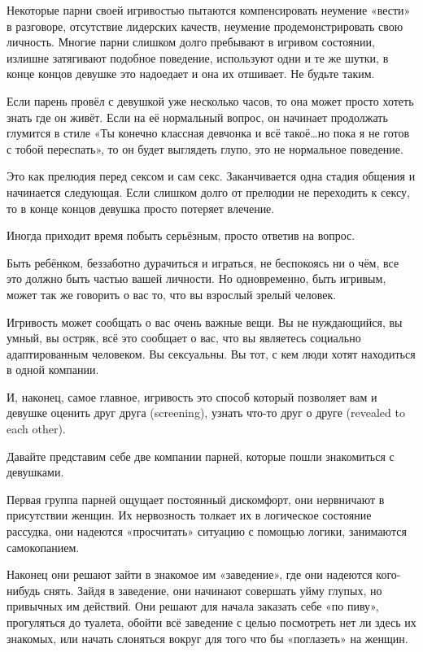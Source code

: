 Некоторые парни своей игривостью пытаются компенсировать неумение «вести» в разговоре, отсутствие лидерских качеств, неумение продемонстрировать свою личность. Многие парни слишком долго пребывают в игривом состоянии, излишне затягивают подобное поведение, используют одни и те же шутки, в конце концов девушке это надоедает и она их отшивает. Не будьте таким.

Если парень провёл с девушкой уже несколько часов, то она может просто хотеть знать где он живёт. Если на её нормальный вопрос, он начинает продолжать глумится в стиле «Ты конечно классная девчонка и всё такоё\ldots но пока я не готов с тобой переспать», то он будет выглядеть глупо, это не нормальное поведение.

Это как прелюдия перед сексом и сам секс. Заканчивается одна стадия общения и начинается следующая. Если слишком долго от прелюдии не переходить к сексу, то в конце концов девушка просто потеряет влечение.

Иногда приходит время побыть серьёзным, просто ответив на вопрос.

Быть ребёнком, беззаботно дурачиться и играться, не беспокоясь ни о чём, все это должно быть частью вашей личности. Но одновременно, быть игривым, может так же говорить о вас то, что вы взрослый зрелый человек.

Игривость может сообщать о вас очень важные вещи. Вы не нуждающийся, вы умный, вы остряк, всё это сообщает о вас, что вы являетесь социально адаптированным человеком. Вы сексуальны. Вы тот, с кем люди хотят находиться в одной компании.

И, наконец, самое главное, игривость это способ который позволяет вам и девушке оценить друг друга (screening), узнать что-то друг о друге (revealed to each other).

Давайте представим себе две компании парней, которые пошли знакомиться с девушками.

Первая группа парней ощущает постоянный дискомфорт, они нервничают в присутствии женщин. Их нервозность толкает их в логическое состояние рассудка, они надеются «просчитать» ситуацию с помощью логики, занимаются самокопанием.

Наконец они решают зайти в знакомое им «заведение», где они надеются кого-нибудь снять. Зайдя в заведение, они начинают совершать уйму глупых, но привычных им действий. Они решают для начала заказать себе «по пиву», прогуляться до туалета, обойти всё заведение с целью посмотреть нет ли здесь их знакомых, или начать слоняться вокруг для того что бы «поглазеть» на женщин.

